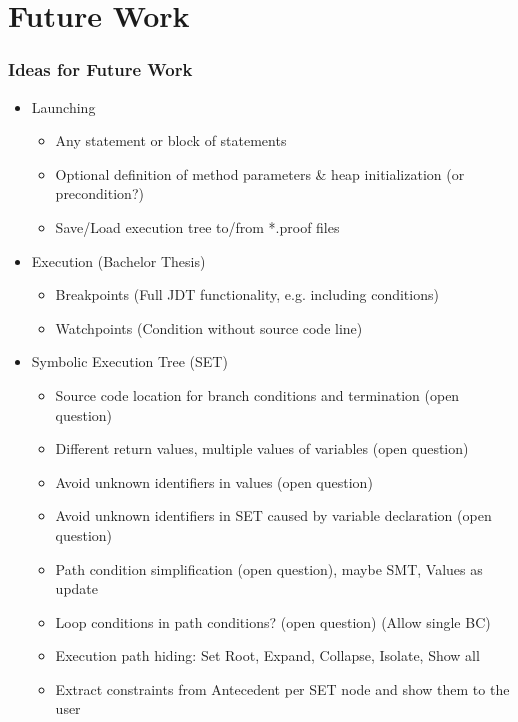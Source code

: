 \documentclass[accentcolor=tud9d,colorbacktitle,inverttitle,landscape,english,presentation,t]{tudbeamer}
\begin{document}
\section{Future Work}
   \begin{frame}[t]
		\frametitle{Ideas for Future Work}
      
      \begin{itemize}
         \item Launching
               \begin{itemize}
                  \item Any statement or block of statements
                  \item Optional definition of method parameters \& heap initialization (or precondition?)
                  \item Save/Load execution tree to/from *.proof files
               \end{itemize}
         \item Execution (Bachelor Thesis)
               \begin{itemize}
                  \item Breakpoints (Full JDT functionality, e.g. including conditions)
                  \item Watchpoints (Condition without source code line)
               \end{itemize}
         \item Symbolic Execution Tree (SET)
               \begin{itemize}
                  \item Source code location for branch conditions and termination (open question)
                  \item Different return values, multiple values of variables (open question)
                  \item Avoid unknown identifiers in values (open question)
                  \item Avoid unknown identifiers in SET caused by variable declaration (open question)
                  \item Path condition simplification (open question), maybe SMT, Values as update
                  \item Loop conditions in path conditions? (open question) (Allow single BC)
                  \item Execution path hiding: Set Root, Expand, Collapse, Isolate, Show all
                  \item Extract constraints from Antecedent per SET node and show them to the user
               \end{itemize}
      \end{itemize}
	\end{frame}
   
\end{document}
